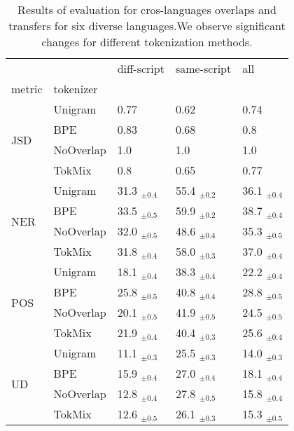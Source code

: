 \begin{table}

\centering
\caption{Results of evaluation for cros-languages overlaps and transfers for six diverse languages.We observe significant changes for different tokenization methods.}
\label{tab:X_lang}
\small
\begin{tabular}{lllll}
\toprule
        &        &       diff-script &       same-script &               all \\
metric & tokenizer &                   &                   &                   \\
\midrule
\multirow{4}{*}{JSD} & Unigram &              0.77 &              0.62 &              0.74 \\
        & BPE &              0.83 &              0.68 &               0.8 \\
        & NoOverlap &               1.0 &               1.0 &               1.0 \\
        & TokMix &               0.8 &              0.65 &              0.77 \\
\cline{1-5}
\multirow{4}{*}{NER} & Unigram &  31.3 $_{\pm0.4}$ &  55.4 $_{\pm0.2}$ &  36.1 $_{\pm0.4}$ \\
        & BPE &  33.5 $_{\pm0.5}$ &  59.9 $_{\pm0.2}$ &  38.7 $_{\pm0.4}$ \\
        & NoOverlap &  32.0 $_{\pm0.5}$ &  48.6 $_{\pm0.4}$ &  35.3 $_{\pm0.5}$ \\
        & TokMix &  31.8 $_{\pm0.4}$ &  58.0 $_{\pm0.3}$ &  37.0 $_{\pm0.4}$ \\
\cline{1-5}
\multirow{4}{*}{POS} & Unigram &  18.1 $_{\pm0.4}$ &  38.3 $_{\pm0.4}$ &  22.2 $_{\pm0.4}$ \\
        & BPE &  25.8 $_{\pm0.5}$ &  40.8 $_{\pm0.4}$ &  28.8 $_{\pm0.5}$ \\
        & NoOverlap &  20.1 $_{\pm0.5}$ &  41.9 $_{\pm0.5}$ &  24.5 $_{\pm0.5}$ \\
        & TokMix &  21.9 $_{\pm0.4}$ &  40.4 $_{\pm0.3}$ &  25.6 $_{\pm0.4}$ \\
\cline{1-5}
\multirow{4}{*}{UD} & Unigram &  11.1 $_{\pm0.3}$ &  25.5 $_{\pm0.3}$ &  14.0 $_{\pm0.3}$ \\
        & BPE &  15.9 $_{\pm0.4}$ &  27.0 $_{\pm0.4}$ &  18.1 $_{\pm0.4}$ \\
        & NoOverlap &  12.8 $_{\pm0.4}$ &  27.8 $_{\pm0.5}$ &  15.8 $_{\pm0.4}$ \\
        & TokMix &  12.6 $_{\pm0.5}$ &  26.1 $_{\pm0.3}$ &  15.3 $_{\pm0.5}$ \\

\end{tabular}
\end{table}
